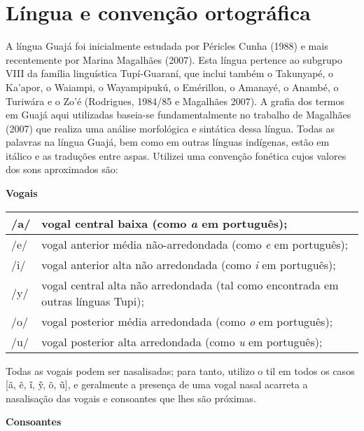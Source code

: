 \hypertarget{luxedngua-e-convenuxe7uxe3o-ortogruxe1fica}{%
\section{Língua e convenção
ortográfica}\label{luxedngua-e-convenuxe7uxe3o-ortogruxe1fica}}

A língua Guajá foi inicialmente estudada por Péricles Cunha (1988) e
mais recentemente por Marina Magalhães (2007). Esta língua pertence ao
subgrupo VIII da família linguística Tupí-Guaraní, que inclui também o
Takunyapé, o Ka'apor, o Waiampi, o Wayampipukú, o Emérillon, o Amanayé,
o Anambé, o Turiwára e o Zo'é (Rodrigues, 1984/85 e Magalhães 2007). A
grafia dos termos em Guajá aqui utilizadas baseia-se fundamentalmente no
trabalho de Magalhães (2007) que realiza uma análise morfológica e
sintática dessa língua. Todas as palavras na língua Guajá, bem como em
outras línguas indígenas, estão em itálico e as traduções entre aspas.
Utilizei uma convenção fonética cujos valores dos sons aproximados são:

\textbf{Vogais}

\begin{longtable}[]{@{}ll@{}}
\toprule
/a/ & vogal central baixa (como \emph{a} em português);\tabularnewline
\midrule
\endhead
/e/ & vogal anterior média não-arredondada (como \emph{e} em
português);\tabularnewline
/i/ & vogal anterior alta não arredondada (como \emph{i} em
português);\tabularnewline
/y/ & vogal central alta não arredondada (tal como encontrada em outras
línguas Tupi);\tabularnewline
/o/ & vogal posterior média arredondada (como \emph{o} em
português);\tabularnewline
/u/ & vogal posterior alta arredondada (como \emph{u} em
português);\tabularnewline
\bottomrule
\end{longtable}

Todas as vogais podem ser nasalisadas; para tanto, utilizo o til em
todos os casos {[}ã, ẽ, ĩ, ỹ, õ, ũ{]}, e geralmente a presença de uma
vogal nasal acarreta a nasalisação das vogais e consoantes que lhes são
próximas.

\textbf{Consoantes}


